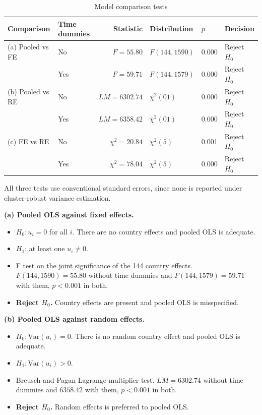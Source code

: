 \documentclass[11pt,a4paper]{article}
\begin{document}
\begin{table}[H]
\centering
\small
\caption{Model comparison tests}
\label{tab:tests}
\begin{tabular}{@{}ll rll l@{}}
\toprule
Comparison & Time dummies & Statistic & Distribution & $p$ & Decision \\
\midrule
(a) Pooled vs FE & No  & $F=55.80$      & $F(144,1590)$   & 0.000 & Reject $H_0$ \\
                 & Yes & $F=59.71$      & $F(144,1579)$   & 0.000 & Reject $H_0$ \\
\addlinespace
(b) Pooled vs RE & No  & $LM=6302.74$   & $\bar\chi^2(01)$ & 0.000 & Reject $H_0$ \\
                 & Yes & $LM=6358.42$   & $\bar\chi^2(01)$ & 0.000 & Reject $H_0$ \\
\addlinespace
(c) FE vs RE     & No  & $\chi^2=20.84$ & $\chi^2(5)$     & 0.001 & Reject $H_0$ \\
                 & Yes & $\chi^2=78.04$ & $\chi^2(5)$     & 0.000 & Reject $H_0$ \\
\bottomrule
\end{tabular}
\begin{minipage}{\textwidth}\vspace{4pt}\footnotesize
All three tests use conventional standard errors, since none is reported under
cluster-robust variance estimation.
\end{minipage}
\end{table}

\textbf{(a) Pooled OLS against fixed effects.}

\begin{itemize}
  \item $H_0 : u_i = 0$ for all $i$. There are no country effects and pooled OLS
        is adequate.
  \item $H_1$: at least one $u_i \neq 0$.
  \item F test on the joint significance of the 144 country effects.
        $F(144,1590) = 55.80$ without time dummies and $F(144,1579) = 59.71$
        with them, $p < 0.001$ in both.
  \item \textbf{Reject $H_0$.} Country effects are present and pooled OLS is
        misspecified.
\end{itemize}

\textbf{(b) Pooled OLS against random effects.}

\begin{itemize}
  \item $H_0 : \mathrm{Var}(u_i) = 0$. There is no random country effect and
        pooled OLS is adequate.
  \item $H_1 : \mathrm{Var}(u_i) > 0$.
  \item Breusch and Pagan Lagrange multiplier test. $LM = 6302.74$ without time
        dummies and $6358.42$ with them, $p < 0.001$ in both.
  \item \textbf{Reject $H_0$.} Random effects is preferred to pooled OLS.
\end{itemize}
\end{document}
